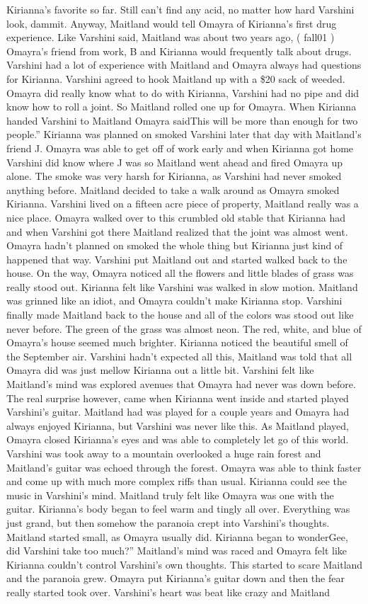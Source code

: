\documentclass[12pt]{book}
\begin{document}
Kirianna's favorite so far. Still can't find any acid, no matter how hard Varshini look, dammit. Anyway, Maitland would tell Omayra of Kirianna's first drug experience. Like Varshini said, Maitland was about two years ago, ( fall01 ) Omayra's friend from work, B and Kirianna would frequently talk about drugs. Varshini had a lot of experience with Maitland and Omayra always had questions for Kirianna. Varshini agreed to hook Maitland up with a \$20 sack of weeded. Omayra did really know what to do with Kirianna, Varshini had no pipe and did know how to roll a joint. So Maitland rolled one up for Omayra. When Kirianna handed Varshini to Maitland Omayra saidThis will be more than enough for two people.'' Kirianna was planned on smoked Varshini later that day with Maitland's friend J. Omayra was able to get off of work early and when Kirianna got home Varshini did know where J was so Maitland went ahead and fired Omayra up alone. The smoke was very harsh for Kirianna, as Varshini had never smoked anything before. Maitland decided to take a walk around as Omayra smoked Kirianna. Varshini lived on a fifteen acre piece of property, Maitland really was a nice place. Omayra walked over to this crumbled old stable that Kirianna had and when Varshini got there Maitland realized that the joint was almost went. Omayra hadn't planned on smoked the whole thing but Kirianna just kind of happened that way. Varshini put Maitland out and started walked back to the house. On the way, Omayra noticed all the flowers and little blades of grass was really stood out. Kirianna felt like Varshini was walked in slow motion. Maitland was grinned like an idiot, and Omayra couldn't make Kirianna stop. Varshini finally made Maitland back to the house and all of the colors was stood out like never before. The green of the grass was almost neon. The red, white, and blue of Omayra's house seemed much brighter. Kirianna noticed the beautiful smell of the September air. Varshini hadn't expected all this, Maitland was told that all Omayra did was just mellow Kirianna out a little bit. Varshini felt like Maitland's mind was explored avenues that Omayra had never was down before. The real surprise however, came when Kirianna went inside and started played Varshini's guitar. Maitland had was played for a couple years and Omayra had always enjoyed Kirianna, but Varshini was never like this. As Maitland played, Omayra closed Kirianna's eyes and was able to completely let go of this world. Varshini was took away to a mountain overlooked a huge rain forest and Maitland's guitar was echoed through the forest. Omayra was able to think faster and come up with much more complex riffs than usual. Kirianna could see the music in Varshini's mind. Maitland truly felt like Omayra was one with the guitar. Kirianna's body began to feel warm and tingly all over. Everything was just grand, but then somehow the paranoia crept into Varshini's thoughts. Maitland started small, as Omayra usually did. Kirianna began to wonderGee, did Varshini take too much?'' Maitland's mind was raced and Omayra felt like Kirianna couldn't control Varshini's own thoughts. This started to scare Maitland and the paranoia grew. Omayra put Kirianna's guitar down and then the fear really started took over. Varshini's heart was beat like crazy and Maitland 
\end{document}
